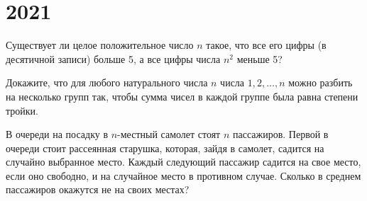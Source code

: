 \documentclass[11pt, a4paper]{template}
\begin{document}
\chapter{2021}

\begin{exercise}[M2638]
Существует ли целое положительное число $n$ такое, что все его цифры (в десятичной записи) больше 5, а все цифры числа $n^{2}$ меньше 5?
\end{exercise}

\begin{exercise}[M2669]
Докажите, что для любого натурального числа $n$ числа $1, 2, \dots, n$ можно разбить на несколько групп так, чтобы сумма чисел в каждой группе была равна степени тройки.
\end{exercise}

\begin{exercise}[M2673]
В очереди на посадку в $n$-местный самолет стоят $n$ пассажиров. Первой в очереди стоит рассеянная старушка, которая, зайдя в самолет, садится на случайно выбранное место. Каждый следующий пассажир садится на свое место, если оно свободно, и на случайное место в противном случае. Сколько в среднем пассажиров окажутся не на своих местах?
\end{exercise}
\end{document}
